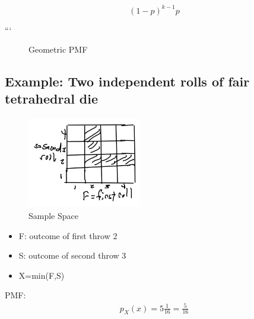 
$$(1-p)^{k-1}p$$

```

\edef\mylst{"p","p(1-p)"}

\begin{figure}[ht]
\centering

\caption{Geometric PMF}
\end{figure}

\subsection{Example: Two independent rolls of fair tetrahedral die}


\begin{figure}[ht]
\centering
\includegraphics[width=5cm, height=4cm]{images/L05/min_2die_roll.jpeg}
\caption{Sample Space}
\end{figure}

\begin{itemize}
    \item F: outcome of first throw 2
    \item S: outcome of second throw 3
    \item X=min(F,S)
\end{itemize}

PMF: 
\begin{align*}
p_X(x)=5\frac{1}{16}=\frac{5}{16}
\end{align*}

